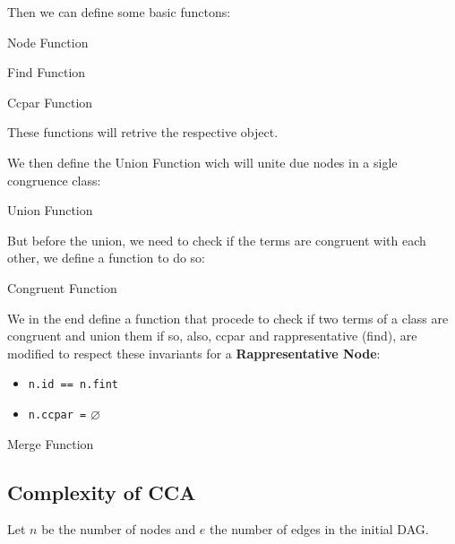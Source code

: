 Then we can define some basic functons:

\begin{codee}{Node Function}
\end{codee}

\begin{codee}{Find Function}
\end{codee}

\begin{codee}{Ccpar Function}
\end{codee}

These functions will retrive the respective object.

We then define the Union Function wich will unite due nodes
in a sigle congruence class:

\begin{codee}{Union Function}
\end{codee}

But before the union, we need to check if the terms 
are congruent with each other, we define a function to do so:

\begin{codee}{Congruent Function}
\end{codee}

We in the end define a function that procede 
to check if two terms of a class are congruent and union them if so,
also, ccpar and rappresentative (find), are modified to respect 
these invariants for a \textbf{Rappresentative Node}:
\begin{itemize}
    \item \texttt{n.id == n.fint}
    \item \texttt{n.ccpar =} $\varnothing$
\end{itemize}

\begin{codee}{Merge Function}
\end{codee}

\subsection{Complexity of CCA}
\label{subsec:Complexity of CCA}

Let $n$ be the number of nodes and $e$ 
the number of edges in the initial DAG.


